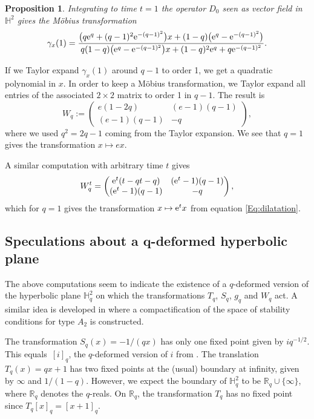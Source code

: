 \documentclass[10pt,a4paper]{amsart}
\numberwithin{equation}{section}
\newtheorem{Proposition}[Theorem]{Proposition}
 { \theoremstyle{definition}
\newtheorem{Definition}[Theorem]{Definition}
\newtheorem{Note}[Theorem]{Note}
\newtheorem{Example}[Theorem]{Example}
\newtheorem{Remark}[Theorem]{Remark} }
\newcommand*{\R}{\mathbb{R}}
\renewcommand*{\H}{\mathbb{H}}
\begin{document}
\begin{Proposition}
Integrating to time $t=1$ the operator $D_0$ seen as vector field in $\H^2$ gives the M\"obius transformation
\[
\gamma_x(1)=\frac{\big(q{\rm e}^q+(q-1)^2{\rm e}^{-(q-1)^2}\big)x+(1-q)\big({\rm e}^q-{\rm e}^{-(q-1)^2}\big)}{q(1-q)\big({\rm e}^q-{\rm e}^{-(q-1)^2}\big)x+(1-q)^2{\rm e}^q+q{\rm e}^{-(q-1)^2}}.
\]
\end{Proposition}

If we Taylor expand $\gamma_x(1)$ around $q-1$ to order 1, we get a quadratic polynomial in $x$. In order to keep a M\"obius transformation, we Taylor expand all entries of the associated $2\times 2$ matrix to order 1 in $q-1$. The result is
\[
W_q := \begin{pmatrix} e(1-2q) & (e-1)(q-1) \\ (e-1)(q-1) & -q\end{pmatrix},\]
where we used $q^2=2q-1$ coming from the Taylor expansion.
We see that $q=1$ gives the transformation $x\mapsto ex$.

A similar computation with arbitrary time $t$ gives
\[
W_q^t = \begin{pmatrix} {\rm e}^t(t-qt-q) & ({\rm e}^t-1)(q-1) \\ ({\rm e}^t-1)(q-1) & -q\end{pmatrix},
\]
which for $q=1$ gives the transformation $x\mapsto {\rm e}^t x$ from equation \eqref{Eq:dilatation}.

\subsection[Speculations about a q-deformed hyperbolic plane]{Speculations about a $\boldsymbol{q}$-deformed hyperbolic plane}

The above computations seem to indicate the existence of a $q$-deformed version of the hyperbolic plane $\H^2_q$ on which the transformations $T_q$, $S_q$, $g_q$ and $W_q$ act. A similar idea is developed in \cite{bapat2023q} where a compactification of the space of stability conditions for type $A_2$ is constructed.

The transformation $S_q(x)=-1/(qx)$ has only one fixed point given by $iq^{-1/2}$. This equals~$[i]_q$, the $q$-deformed version of $i$ from \cite[formula~(9)]{ovsienko2021towards}.
The translation $T_q(x)=qx+1$ has two fixed points at the (usual) boundary at infinity, given by $\infty$ and $1/(1-q)$. However, we expect the boundary of $\H^2_q$ to be $\R_q\cup \{\infty\}$, where $\R_q$ denotes the $q$-reals. On $\R_q$, the transformation $T_q$ has no fixed point since $T_q[x]_q=[x+1]_q$.
\end{document}
